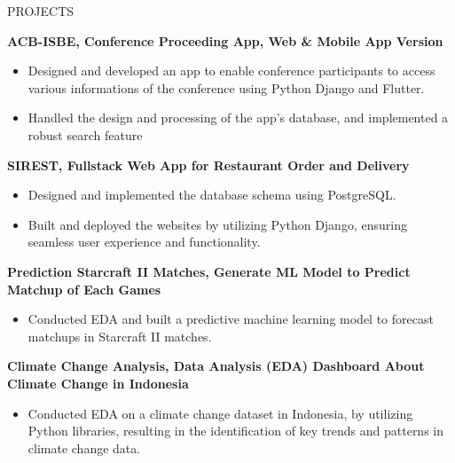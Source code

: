 \documentclass{resume} %
\begin{document}

\begin{rSection}{PROJECTS}

{\bf ACB-ISBE, Conference Proceeding App, Web \& Mobile App Version}
\vspace{-0.75em}
\begin{itemize}
\itemsep -7pt {}
\item Designed and developed an app to enable conference participants to access various informations of the conference using Python Django and Flutter.
\item Handled the design and processing of the app's database, and implemented a robust search feature
 \end{itemize}
 \vspace{-0.25em}

{\bf SIREST, Fullstack Web App for Restaurant Order and Delivery}
\vspace{-0.75em}
\begin{itemize}
\itemsep -7pt {}
\item Designed and implemented the database schema using PostgreSQL.
\item Built and deployed the websites by utilizing Python Django, ensuring seamless user experience and functionality.
 \end{itemize}
 \vspace{-0.25em}

{\bf Prediction Starcraft II Matches, Generate ML Model to Predict Matchup of Each Games}
\vspace{-0.75em}
\begin{itemize}
\itemsep -7pt {}
\item Conducted EDA and built a predictive machine learning model to forecast matchups in Starcraft II matches.
 \end{itemize}
 \vspace{-0.25em}

{\bf Climate Change Analysis, Data Analysis (EDA) Dashboard About Climate Change in Indonesia}
\vspace{-0.75em}
\begin{itemize}
\itemsep -7pt {}
\item Conducted EDA on a climate change dataset in Indonesia, by utilizing Python libraries, resulting in the identification of key trends and patterns in climate change data.
 \end{itemize}
 \vspace{-0.25em}


\end{rSection} 
\end{document}
